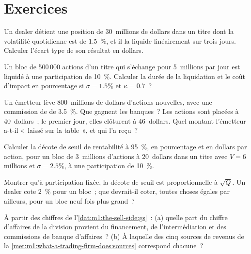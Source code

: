 \section{Exercices}

\begin{exercise}[$\star$]\label{exo:m1:the-sell-side:1}
Un dealer détient une position de 30~millions de dollars dans un titre dont la volatilité quotidienne
est de 1.5~\%, et il la liquide linéairement sur trois jours. Calculer l'écart type de son
résultat en dollars.
\end{exercise}

\begin{exercise}[$\star$]\label{exo:m1:the-sell-side:2}
Un bloc de 500\,000 actions d'un titre qui s'échange pour 5~millions par jour est liquidé
à une participation de 10~\%. Calculer la durée de la liquidation et le coût d'impact en
pourcentage si $\sigma = 1.5\%$ et $\kappa = 0.7$~?
\end{exercise}

\begin{exercise}[$\star$]\label{exo:m1:the-sell-side:3}
Un émetteur lève 800~millions de dollars d'actions nouvelles, avec une commission de 
de 3.5~\%. Que gagnent les banques~? Les actions sont placées à 40~dollars~; le premier jour,
elles clôturent à 46~dollars. Quel montant l'émetteur a-t-il «~laissé sur la table~», et
qui l'a reçu~?
\end{exercise}

\begin{exercise}[$\star\star$]\label{exo:m1:the-sell-side:4}
Calculer la décote de seuil de rentabilité à 95~\%, en pourcentage et en dollars par action,
pour un bloc de 3~millions d'actions à 20~dollars dans un titre avec $V = 6$ millions et
$\sigma = 2.5\%$, à une participation de 10~\%.
\end{exercise}

\begin{exercise}[$\star\star$]\label{exo:m1:the-sell-side:5}
Montrer qu'à participation fixée, la décote de seuil est proportionnelle à
$\sqrt{Q}$. Un dealer cote 2~\% pour un bloc~; que devrait-il coter, toutes choses
égales par ailleurs, pour un bloc neuf fois plus grand~?
\end{exercise}

\begin{exercise}[$\star\star$]\label{exo:m1:the-sell-side:6}
À partir des chiffres de l'\cref{dat:m1:the-sell-side:gs}~: (a) quelle part du chiffre d'affaires
de la division provient du financement, de l'intermédiation et des
commissions de banque d'affaires~? (b) À laquelle des cinq sources de revenus de
la \cref{met:m1:what-a-trading-firm-does:sources} correspond chacune~?
\end{exercise}

